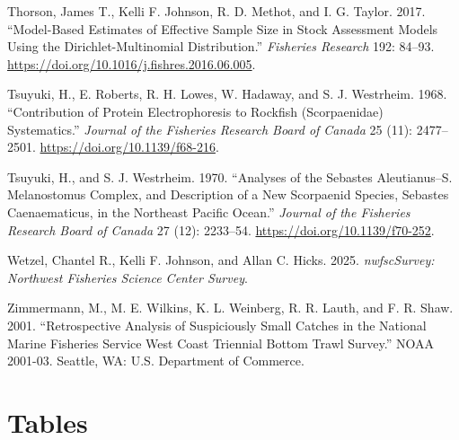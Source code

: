 \documentclass[
]{scrartcl}
\newlength{\cslhangindent}
\newenvironment{CSLReferences}[2] %
 {\begin{list}{}{%
  \setlength{\itemindent}{0pt}
  \setlength{\leftmargin}{0pt}
  \setlength{\parsep}{0pt}
  \ifodd #1
   \setlength{\leftmargin}{\cslhangindent}
   \setlength{\itemindent}{-1\cslhangindent}
  \fi
  \setlength{\itemsep}{#2\baselineskip}}}
 {\end{list}}
\begin{document}
\begin{CSLReferences}{1}{0}
Thorson, James T., Kelli F. Johnson, R. D. Methot, and I. G. Taylor.
2017. {``Model-Based Estimates of Effective Sample Size in Stock
Assessment Models Using the {Dirichlet}-Multinomial Distribution.''}
\emph{Fisheries Research} 192: 84--93.
\url{https://doi.org/10.1016/j.fishres.2016.06.005}.

Tsuyuki, H., E. Roberts, R. H. Lowes, W. Hadaway, and S. J. Westrheim.
1968. {``Contribution of {Protein} {Electrophoresis} to {Rockfish}
({Scorpaenidae}) {Systematics}.''} \emph{Journal of the Fisheries
Research Board of Canada} 25 (11): 2477--2501.
\url{https://doi.org/10.1139/f68-216}.

Tsuyuki, H., and S. J. Westrheim. 1970. {``Analyses of the {Sebastes}
Aleutianus--{S}. Melanostomus {Complex}, and {Description} of a New
{Scorpaenid} {Species}, {Sebastes} Caenaematicus, in the {Northeast}
{Pacific} {Ocean}.''} \emph{Journal of the Fisheries Research Board of
Canada} 27 (12): 2233--54. \url{https://doi.org/10.1139/f70-252}.

Wetzel, Chantel R., Kelli F. Johnson, and Allan C. Hicks. 2025.
\emph{nwfscSurvey: Northwest Fisheries Science Center Survey}.

Zimmermann, M., M. E. Wilkins, K. L. Weinberg, R. R. Lauth, and F. R.
Shaw. 2001. {``Retrospective Analysis of Suspiciously Small Catches in
the {N}ational {M}arine {F}isheries {S}ervice West Coast Triennial
Bottom Trawl Survey.''} NOAA 2001-03. Seattle, WA: {U}.{S}. Department
of Commerce.

\end{CSLReferences}

\newpage{}

\section{Tables}\label{tables}

\begingroup
\fontsize{9.0pt}{10.8pt}\selectfont
\end{document}

